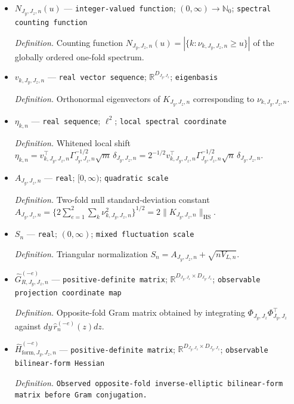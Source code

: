 \documentclass{article}
\begin{document}
\begin{itemize}
  \par\smallskip\noindent\emph{Definition.} Nonzero eigenvalues of \(K_{J_y,J_z,n}\), repeated with multiplicity.
  \item \(N_{J_y,J_z,n}(u)\) --- \texttt{integer-\allowbreak{}valued function}; \((0,\infty)\to\mathbb N_0\); \texttt{spectral counting function}
  \par\smallskip\noindent\emph{Definition.} Counting function \(N_{J_y,J_z,n}(u)=|\{k:\nu_{k,J_y,J_z,n}\ge u\}|\) of the globally ordered one-fold spectrum.
  \item \(v_{k,J_y,J_z,n}\) --- \texttt{real vector sequence}; \(\mathbb R^{D_{J_y,J_z}}\); \texttt{eigenbasis}
  \par\smallskip\noindent\emph{Definition.} Orthonormal eigenvectors of \(K_{J_y,J_z,n}\) corresponding to \(\nu_{k,J_y,J_z,n}\).
  \item \(\eta_{k,n}\) --- \texttt{real sequence}; \(\ell^2\); \texttt{local spectral coordinate}
  \par\smallskip\noindent\emph{Definition.} Whitened local shift \(\eta_{k,n}=v_{k,J_y,J_z,n}^{\top}\Gamma_{J_y,J_z,n}^{-1/2}\sqrt{m}\,\delta_{J_y,J_z,n}=2^{-1/2}v_{k,J_y,J_z,n}^{\top}\Gamma_{J_y,J_z,n}^{-1/2}\sqrt n\,\delta_{J_y,J_z,n}\).
  \item \(A_{J_y,J_z,n}\) --- \texttt{real}; \([0,\infty)\); \texttt{quadratic scale}
  \par\smallskip\noindent\emph{Definition.} Two-fold null standard-deviation constant \(A_{J_y,J_z,n}=\{2\sum_{e=1}^2\sum_k\nu_{k,J_y,J_z,n}^2\}^{1/2}=2\|K_{J_y,J_z,n}\|_{\mathrm{HS}}\).
  \item \(S_n\) --- \texttt{real}; \((0,\infty)\); \texttt{mixed fluctuation scale}
  \par\smallskip\noindent\emph{Definition.} Triangular normalization \(S_n=A_{J_y,J_z,n}+\sqrt{nV_{L,n}}\).
  \item \(\widehat G_{R,J_y,J_z,n}^{(-e)}\) --- \texttt{positive-\allowbreak{}definite matrix}; \(\mathbb R^{D_{J_y,J_z}\times D_{J_y,J_z}}\); \texttt{observable projection coordinate map}
  \par\smallskip\noindent\emph{Definition.} Opposite-fold Gram matrix obtained by integrating \(\Phi_{J_y,J_z}\Phi_{J_y,J_z}^{\top}\) against \(dy\,\widehat r_n^{(-e)}(z)dz\).
  \item \(\widehat H_{\mathrm{form},J_y,J_z,n}^{(-e)}\) --- \texttt{positive-\allowbreak{}definite matrix}; \(\mathbb R^{D_{J_y,J_z}\times D_{J_y,J_z}}\); \texttt{observable bilinear-\allowbreak{}form Hessian}
  \par\smallskip\noindent\emph{Definition.} \texttt{Observed opposite-\allowbreak{}fold inverse-\allowbreak{}elliptic bilinear-\allowbreak{}form matrix before Gram conjugation.}

\end{itemize}
\end{document}
